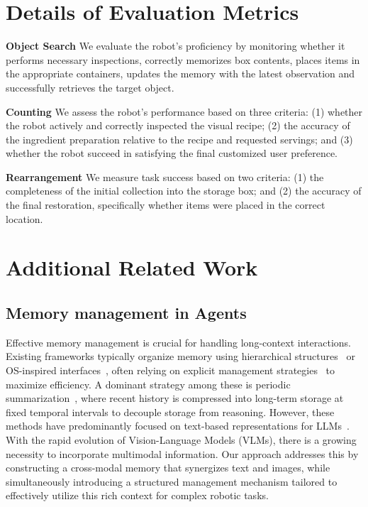 
\section{Details of Evaluation Metrics}
\label{app:eval}

\textbf{Object Search}
We evaluate the robot's proficiency by monitoring whether it performs necessary inspections, correctly memorizes box contents, places items in the appropriate containers, updates the memory with the latest observation and successfully retrieves the target object. 


\textbf{Counting}
We assess the robot's performance based on three criteria: (1) whether the robot actively and correctly inspected the visual recipe; (2) the accuracy of the ingredient preparation relative to the recipe and requested servings; and (3) whether the robot succeed in satisfying the final customized user preference.


\textbf{Rearrangement}
We measure task success based on two criteria: (1) the completeness of the initial collection into the storage box; and (2) the accuracy of the final restoration, specifically whether items were placed in the correct location.


\section{Additional Related Work}
\subsection{Memory management in Agents}
Effective memory management is crucial for handling long-context interactions. 
Existing frameworks typically organize memory using hierarchical structures~\cite{Liu2025MemVerseMM} or OS-inspired interfaces~\cite{Packer2023MemGPTTL}, often relying on explicit management strategies~\cite{Chhikara2025Mem0BP, Xu2025AMEMAM, Yan2025MemoryR1EL} to maximize efficiency.
A dominant strategy among these is periodic summarization~\cite{Long2025SeeingLR, Yeo2025WorldMMDM}, where recent history is compressed into long-term storage at fixed temporal intervals to decouple storage from reasoning.
However, these methods have predominantly focused on text-based representations for LLMs~\cite{Liang2023SCMEL}.
With the rapid evolution of Vision-Language Models (VLMs), there is a growing necessity to incorporate multimodal information.
Our approach addresses this by constructing a cross-modal memory that synergizes text and images, while simultaneously introducing a structured management mechanism tailored to effectively utilize this rich context for complex robotic tasks.

